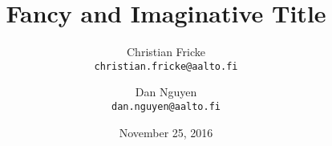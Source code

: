 
\title{Fancy and Imaginative Title}
\date{November 25, 2016}
\author{
  Christian Fricke\\
  \texttt{\large christian.fricke@aalto.fi}
  \and
  Dan Nguyen\\
  \texttt{\large dan.nguyen@aalto.fi}
}

\maketitle


